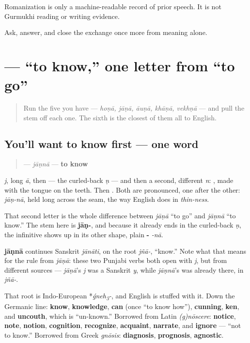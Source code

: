 Romanization is only a machine-readable record of prior speech. It is not Gurmukhi reading or writing evidence.

\begin{tcolorbox}[breakable,colback=teal!4,colframe=teal!35!black,title={Before you move on}]
Ask, answer, and close the exchange once more from meaning alone.
\end{tcolorbox}
\section[\texorpdfstring{\pa{ਜਾਣਨਾ} (jāṇnā)}{ਜਾਣਨਾ (jāṇnā)}]{ — “to know,” one letter from “to go”}

\label{lesson:PA-C07-janna}



\begin{quote}
Run the five you have — \emph{hoṇā, jāṇā, āuṇā, khāṇā, vekhṇā} — and pull the stem off each one. The sixth is the closest of them all to English.
\end{quote}

\subsection*{You'll want to know first — one word}
\begin{quote}
\textbf{} — \emph{jāṇnā} — \textbf{to know}
\end{quote}

\textbf{} \emph{j}, \textbf{} long \emph{ā}, then \textbf{} — the curled-back \emph{ṇ} — and then a second, different \emph{n}: \textbf{}, made with the tongue on the teeth. Then \textbf{}. Both are pronounced, one after the other: \emph{jāṇ-nā}, held long across the seam, the way English does in \emph{thin-ness}.

That second letter is the whole difference between \textbf{} \emph{jāṇā} “to go” and \textbf{} \emph{jāṇnā} “to know.” The stem here is \textbf{jāṇ-}, and because it already ends in the curled-back \emph{ṇ}, the infinitive shows up in its other shape, plain \textbf{-} \emph{-nā}.

\begin{cousinweb}
\textbf{jāṇnā} continues Sanskrit \emph{jānāti}, on the root \emph{jñā-}, “know.” Note what that means for the rule from \emph{jāṇā}: these two Punjabi verbs both open with \textbf{} \emph{j}, but from different sources — \emph{jāṇā}'s \emph{j} was a Sanskrit \emph{y}, while \emph{jāṇnā}'s was already there, in \emph{jñā-}.

That root is Indo-European *\emph{ǵneh\textsubscript{3}-}, and English is stuffed with it. Down the Germanic line: \textbf{know}, \textbf{knowledge}, \textbf{can} (once “to know how”), \textbf{cunning}, \textbf{ken}, and \textbf{uncouth}, which is “un-known.” Borrowed from Latin \emph{(g)nōscere}: \textbf{notice}, \textbf{note}, \textbf{notion}, \textbf{cognition}, \textbf{recognize}, \textbf{acquaint}, \textbf{narrate}, and \textbf{ignore} — “not to know.” Borrowed from Greek \emph{gnōsis}: \textbf{diagnosis}, \textbf{prognosis}, \textbf{agnostic}.
\end{cousinweb}

